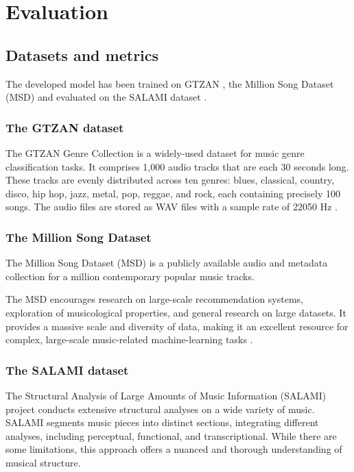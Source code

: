 \chapter{Evaluation}

\section{Datasets and metrics}
\label{section:Datasets and metrics}

The developed model has been trained on GTZAN \cite{GTZAN}, the Million Song Dataset (MSD) \cite{MSD} and evaluated on the SALAMI dataset \cite{Smith2011DESIGNANNOTATIONS}. 

\subsection{The GTZAN dataset}
The GTZAN Genre Collection is a widely-used dataset for music genre classification tasks. It comprises 1,000 audio tracks that are each 30 seconds long. These tracks are evenly distributed across ten genres: blues, classical, country, disco, hip hop, jazz, metal, pop, reggae, and rock, each containing precisely 100 songs. The audio files are stored as WAV files with a sample rate of 22050 Hz \cite{GTZAN}.

\subsection{The Million Song Dataset}
The Million Song Dataset (MSD) is a publicly available audio and metadata collection for a million contemporary popular music tracks.

The MSD encourages research on large-scale recommendation systems, exploration of musicological properties, and general research on large datasets. It provides a massive scale and diversity of data, making it an excellent resource for complex, large-scale music-related machine-learning tasks \cite{MSD}.

\subsection{The SALAMI dataset}

The Structural Analysis of Large Amounts of Music Information (SALAMI) project conducts extensive structural analyses on a wide variety of music. SALAMI segments music pieces into distinct sections, integrating different analyses, including perceptual, functional, and transcriptional. While there are some limitations, this approach offers a nuanced and thorough understanding of musical structure.

